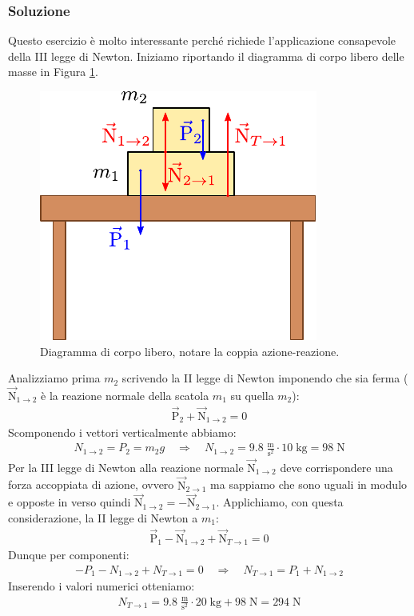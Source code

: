 \documentclass[12pt,a4paper]{book}
\begin{document}
\subsubsection*{Soluzione}
Questo esercizio è molto interessante perché richiede l'applicazione consapevole della III legge di Newton. Iniziamo riportando il diagramma di corpo libero delle masse in Figura \ref{fig:4-e-16}.

\begin{figure}[!h]
\centering
\includegraphics[scale=1.5]{e-16.pdf}
\caption{Diagramma di corpo libero, notare la coppia azione-reazione.} 
\label{fig:4-e-16} 
\end{figure}

Analizziamo prima $m_2$ scrivendo la II legge di Newton imponendo che sia ferma ($\vec{\text{N}}_{1\to2}$ è la reazione normale della scatola $m_1$ su quella $m_2$):
%
\begin{gather*}
\vec{\text{P}}_2+\vec{\text{N}}_{1\to2}=0
\end{gather*}
%
Scomponendo i vettori verticalmente abbiamo:
%
\begin{gather*}
N_{1\to2}=P_2=m_2g \quad \Longrightarrow \quad N_{1\to2}=9.8 \;\frac{\text{m}}{\text{s}^2} \cdot 10\;\text{kg}=98\;\text{N}
\end{gather*}
%
Per la III legge di Newton alla reazione normale $\vec{\text{N}}_{1\to2}$ deve corrispondere una forza accoppiata di azione, ovvero $\vec{\text{N}}_{2\to1}$ ma sappiamo che sono uguali in modulo e opposte in verso quindi $\vec{\text{N}}_{1\to2}=-\vec{\text{N}}_{2\to1}$. Applichiamo, con questa considerazione, la II legge di Newton a $m_1$:
%
\begin{gather*}
\vec{\text{P}}_1-\vec{\text{N}}_{1\to2}+\vec{\text{N}}_{T\to1}=0
\end{gather*}
%
Dunque per componenti:
%
\begin{gather*}
-P_1-N_{1\to2}+N_{T\to1}=0 \quad \Longrightarrow \quad N_{T\to1}=P_1+N_{1\to2}
\end{gather*}
%
Inserendo i valori numerici otteniamo:
%
\begin{gather*}
N_{T\to1}=9.8 \;\frac{\text{m}}{\text{s}^2} \cdot 20\;\text{kg} + 98\;\text{N}=294\;\text{N}
\end{gather*}
%
\end{document}
